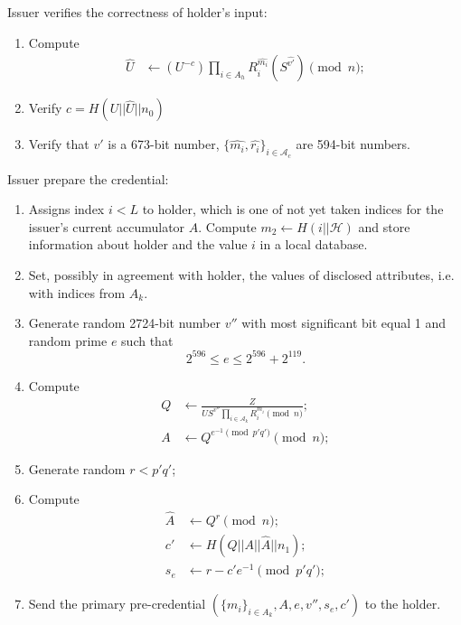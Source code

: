 \documentclass[a4paper]{article}
\begin{document}
Issuer verifies the correctness of holder's input:
\begin{enumerate}
\item Compute
\begin{align}
\widehat{U}& \leftarrow (U^{-c}) \prod_{i \in A_h}{R_i^{\widehat{m_i}}}(S^{\widehat{v'}})\pmod{n};
\end{align}
\item Verify
$c= H(U||\widehat{U}||
n_0)$
\item Verify that $\widehat{v'}$ is a 673-bit number, $\{\widehat{m_i}, \widehat{r_i}\}_{i \in \mathcal{A}_c}$ are 594-bit numbers.
\end{enumerate}
Issuer prepare the credential:
\begin{enumerate}
\item Assigns index $i<L$ to holder, which is one of not yet taken indices for the issuer's current accumulator $A$. Compute $m_2\leftarrow H(i||\mathcal{H})$ and store information about holder and the value $i$ in a local database.
\item Set, possibly in agreement with holder, the values of disclosed attributes, i.e. with indices from $A_k$.
\item Generate random 2724-bit number $v''$ with most significant bit equal 1 and random prime  $e$ such that
\begin{equation}\label{eq:e}
2^{596}\leq e \leq 2^{596}+ 2^{119}.
\end{equation}
\item Compute
\begin{align}
Q& \leftarrow \frac{Z}{U S^{v''} \prod_{i\in \mathcal{A}_k}{R_i^{m_i}}\pmod{n}};\\
A& \leftarrow Q^{e^{-1}\pmod{p'q'}}\pmod{n};
\end{align}
\item Generate random $r < p'q'$;
\item Compute
\begin{align}
\widehat{A}&\leftarrow Q^r\pmod{n};\\
c'&\leftarrow H(Q||A||\widehat{A}||n_1);\\
s_e&\leftarrow r - c'e^{-1}\pmod{p'q'};
\end{align}
\item Send the primary pre-credential  $(\{m_i\}_{i\in A_k},A,e,v'',s_e,c')$ to the holder.
\end{enumerate}
\end{document}

